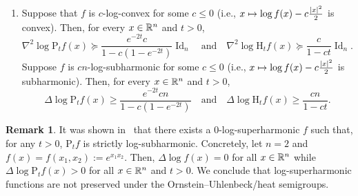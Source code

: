 \documentclass[10pt]{amsart}
\theoremstyle{definition}\newtheorem{defi}[theo]{Definition}\newtheorem{rema}[theo]{Remark}\newtheorem{exam}[theo]{Example}\newtheorem{exem}[theo]{Example}\newtheorem{nota}[theo]{Notation}
\newcommand{\R}{\mathbb R}
\DeclareMathOperator{\Id}{Id}
\newcommand{\Pheat}{\mathrm{P}}
\newcommand{\Hheat}{\mathrm{H}}
\newcommand{\dd}{n}
\newcommand{\conv}{c}
\newcommand{\density}{f}
\let\oldmapsto\mapsto
\renewcommand*{\mapsto}{\mathchoice{\longmapsto}{\oldmapsto}{\oldmapsto}{\oldmapsto}}
\let\oldin\in
\renewcommand{\in}{\mathchoice{\oldin}{\oldin}{\,\oldin\,}{\,\oldin\,}}
\begin{document}
\begin{prop}
\begin{enumerate}
\item\label{propA.2.3} Suppose that $\density$ is $\conv$-log-convex for some $\conv\le 0$ (i.e., $x\mapsto \log \density(x)-\conv\frac{|x|^2}{2}$ is convex). Then, for every $x\in \R^{\dd}$ and $t>0$,
\begin{equation}\label{eq:beta_cvx_appendix}
\nabla^2\log\Pheat_t\density(x)\succeq \frac{e^{-2t}\conv}{1-\conv(1-e^{-2t})} \Id_{\dd}\quad\text{and}\quad \nabla^2\log\Hheat_t\density(x) \succeq \frac{\conv}{1-\conv t}\Id_{\dd}.
\end{equation}
Suppose $\density$ is $\conv\dd$-log-subharmonic for some $\conv\le 0$ (i.e., $x\mapsto \log f(x)-\conv\frac{|x|^2}{2}$ is subharmonic). Then, for every $x\in \R^{\dd}$ and $t>0$,
\begin{equation}\label{eq:beta_subharmonic_appendix}
\Delta\log\Pheat_t\density(x)\ge \frac{e^{-2t}\conv\dd}{1-\conv(1-e^{-2t})}\quad\text{and}\quad \Delta \log\Hheat_t\density(x) \ge \frac{\conv\dd}{1-\conv t}.
\end{equation}
\end{enumerate}
\end{prop}
\begin{rema}
It was shown in~\cite[Remark]{MR4632741} that there exists a $0$-log-superharmonic $\density$ such that, for any $t>0$, $\Pheat_t\density$ is strictly log-subharmonic. Concretely, let $\dd=2$ and $\density(x)=\density(x_1,x_2):=e^{x_1x_2}$. Then, $\Delta\log
\density(x)=0$ for all $x\in \R^{\dd}$ while $\Delta\log
\Pheat_t\density(x)>0$ for all $x\in\R^{\dd}$ and $t>0$. We conclude that log-superharmonic functions are not preserved under the Ornstein--Uhlenbeck/heat semigroups.
\end{rema}
\end{document}
